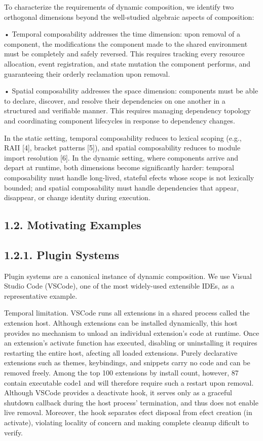 \documentclass[
  10
]{article}
\begin{document}
To characterize the requirements of dynamic composition, we identify two
orthogonal dimensions beyond the well-studied algebraic aspects of
composition:

• Temporal composability addresses the time dimension: upon removal of a
component, the modifications the component made to the shared
environment must be completely and safely reversed. This requires
tracking every resource allocation, event registration, and state
mutation the component performs, and guaranteeing their orderly
reclamation upon removal.

• Spatial composability addresses the space dimension: components must
be able to declare, discover, and resolve their dependencies on one
another in a structured and verifiable manner. This requires managing
dependency topology and coordinating component lifecycles in response to
dependency changes.

In the static setting, temporal composability reduces to lexical scoping
(e.g., RAII {[}4{]}, bracket patterns {[}5{]}), and spatial
composability reduces to module import resolution {[}6{]}. In the
dynamic setting, where components arrive and depart at runtime, both
dimensions become significantly harder: temporal composability must
handle long-lived, stateful efects whose scope is not lexically bounded;
and spatial composability must handle dependencies that appear,
disappear, or change identity during execution.

\subsection{1.2. Motivating Examples}\label{motivating-examples}

\subsection{1.2.1. Plugin Systems}\label{plugin-systems}

Plugin systems are a canonical instance of dynamic composition. We use
Visual Studio Code (VSCode), one of the most widely-used extensible
IDEs, as a representative example.

Temporal limitation. VSCode runs all extensions in a shared process
called the extension host. Although extensions can be installed
dynamically, this host provides no mechanism to unload an individual
extension's code at runtime. Once an extension's activate function has
executed, disabling or uninstalling it requires restarting the entire
host, afecting all loaded extensions. Purely declarative extensions such
as themes, keybindings, and snippets carry no code and can be removed
freely. Among the top 100 extensions by install count, however, 87
contain executable code1 and will therefore require such a restart upon
removal. Although VSCode provides a deactivate hook, it serves only as a
graceful shutdown callback during the host process' termination, and
thus does not enable live removal. Moreover, the hook separates efect
disposal from efect creation (in activate), violating locality of
concern and making complete cleanup dificult to verify.
\end{document}
